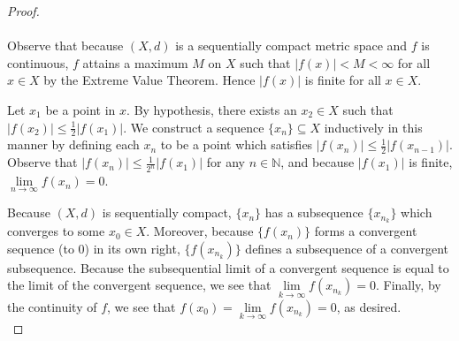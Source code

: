 \begin{proof}\ \\\\
   Observe that because $(X, d)$ is a sequentially compact metric space and $f$ is continuous, $f$ attains a maximum 
   $M$ on $X$ such that $|f(x)| < M < \infty$ for all $x \in X$ by the Extreme Value Theorem. Hence $|f(x)|$ is finite 
   for all $x \in X$.
   
   Let $x_1$ be a point in $x$. By hypothesis, there exists an $x_2 \in X$ such that \linebreak
   $|f(x_2)| \le \frac{1}{2}|f(x_1)|$. We construct a sequence $\{ x_n \} \subseteq X$ inductively in this manner by 
   defining each $x_n$ to be a point which satisfies $|f(x_n)| \le \frac{1}{2}|f(x_{n - 1})|$. Observe that 
   $|f(x_n)| \le \frac{1}{2^n}|f(x_1)|$ for any $n \in \mathbb{N}$, and because $|f(x_1)|$ is finite, 
   $\lim\limits_{n \to \infty}{f(x_n)} = 0$. 

   Because $(X, d)$ is sequentially compact, $\{ x_n \}$ has a subsequence $\{ x_{n_k} \}$ which converges to some 
   $x_0 \in X$. Moreover, because $\{f(x_n)\}$ forms a convergent sequence (to $0$) in its own right, $\{f(x_{n_k})\}$
   defines a subsequence of a convergent subsequence. Because the subsequential limit of a convergent sequence is equal
   to the limit of the convergent sequence, we see that $\lim\limits_{k \to \infty}{f(x_{n_k})} = 0$. Finally, by the 
   continuity of $f$, we see that $f(x_0) = \lim\limits_{k \to \infty}{f(x_{n_k})} = 0$, as desired.
   \ \\
\end{proof}

\pagebreak